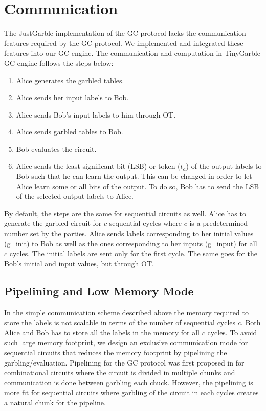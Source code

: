 \section{Communication}\label{sec:engine-comm}
The JustGarble implementation of the GC protocol lacks the communication features required by the GC protocol.
We implemented and integrated these features into our GC engine.
The communication and computation in TinyGarble GC engine follows the steps below:
\begin{enumerate}
\item Alice generates the garbled tables.
\item Alice sends her input labels to Bob.
\item Alice sends Bob's input labels to him through OT.
\item Alice sends garbled tables to Bob.
\item Bob evaluates the circuit.
\item Alice sends the least significant bit (LSB) or token (${t}_a$) of the output labels to Bob such that he can learn the output.
  This can be changed in order to let Alice learn some or all bits of the output.
  To do so, Bob has to send the LSB of the selected output labels to Alice.
\end{enumerate}

By default, the steps are the same for sequential circuits as well.
Alice has to generate the garbled circuit for $c$ sequential cycles where $c$ is a predetermined number set by the parties.
Alice sends labels corresponding to her initial values (g\_init) to Bob as well as the ones corresponding to her inputs (g\_input) for all $c$ cycles.
The initial labels are sent only for the first cycle.
The same goes for the Bob's initial and input values, but through OT.

\subsection{Pipelining and Low Memory Mode}\label{sec:engine-memory}
In the simple communication scheme described above the memory required to store the labels is not scalable in terms of the number of sequential cycles $c$.
Both Alice and Bob has to store all the labels in the memory for all $c$ cycles.
To avoid such large memory footprint, we design an exclusive communication mode for sequential circuits that reduces the memory footprint by pipelining the garbling/evaluation.
Pipelining for the GC protocol was first proposed in \cite{husted2013gpu} for combinational circuits where the circuit is divided in multiple chunks and communication is done between garbling each chuck.
However, the pipelining is more fit for sequential circuits where garbling of the circuit in each cycles creates a natural chunk for the pipeline.

